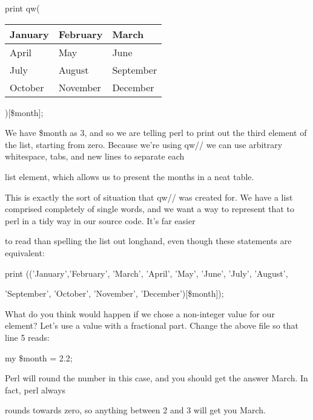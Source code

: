 \documentclass[a4paper,11pt]{book}
\begin{document}
\noindent 

\noindent print qw(

\begin{tabular}{|p{1.1in}|p{0.6in}|p{0.5in}|} \hline 
January & February & March \\ \hline 
April & May & June \\ \hline 
July & August & September \\ \hline 
October & November & December \\ \hline 
\end{tabular}

)[\$month];

\noindent 

\noindent We have \$month as 3, and so we are telling perl to print out the third element of the list, starting from zero. Because we're using qw// we can use arbitrary whitespace, tabs, and new lines to separate each

\noindent list element, which allows us to present the months in a neat table.

\noindent 

\noindent This is exactly the sort of situation that qw// was created for. We have a list comprised completely of single words, and we want a way to represent that to perl in a tidy way in our source code. It's far easier

\noindent to read than spelling the list out longhand, even though these statements are equivalent:

\noindent 

\noindent print (('January','February', 'March', 'April', 'May', 'June', 'July', 'August',

\noindent 'September', 'October', 'November', 'December')[\$month]);

\noindent 

\noindent What do you think would happen if we chose a non-integer value for our element? Let's use a value with a fractional part. Change the above file so that line 5 reads:

\noindent 

\noindent my \$month = 2.2;

\noindent 

\noindent 

\noindent Perl will round the number in this case, and you should get the answer March. In fact, perl always

\noindent rounds towards zero, so anything between 2 and 3 will get you March.
\end{document}
